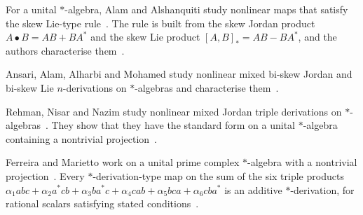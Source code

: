 For a unital $*$-algebra, Alam and Alshanquiti study nonlinear maps that
satisfy the skew Lie-type rule~\cite{WlNonlinearMixedSkewLieTypeDeriv2026}. The rule is built from the skew Jordan product
$A\bullet
B=AB+BA^*$ and the skew Lie product $[A,B]_*=AB-BA^*$, and the authors
characterise
them~\cite{WlNonlinearMixedSkewLieTypeDeriv2026}.

Ansari, Alam, Alharbi and Mohamed study nonlinear mixed bi-skew Jordan and
bi-skew Lie $n$-derivations on $*$-algebras and characterise
them~\cite{WlANoteOnNonlinearMixedBiSkewJor2026}.

Rehman, Nisar and Nazim study nonlinear mixed Jordan triple derivations on
$*$-algebras~\cite{WlANoteOnNonlinearMixedJordanTri2022}. They show that they have the standard form on a unital $*$-algebra
containing a nontrivial
projection~\cite{WlANoteOnNonlinearMixedJordanTri2022}.

Ferreira and Marietto work on a unital prime complex $*$-algebra with a
nontrivial projection~\cite{WlNonlinearMapsOfDerivationTypeO2023}. Every $*$-derivation-type map on the sum of the six
triple products
$\alpha_1abc+\alpha_2a^*cb+\alpha_3ba^*c+\alpha_4cab+\alpha_5bca+\alpha_6cba^*$
is an additive $*$-derivation, for rational scalars satisfying stated
conditions~\cite{WlNonlinearMapsOfDerivationTypeO2023}.
